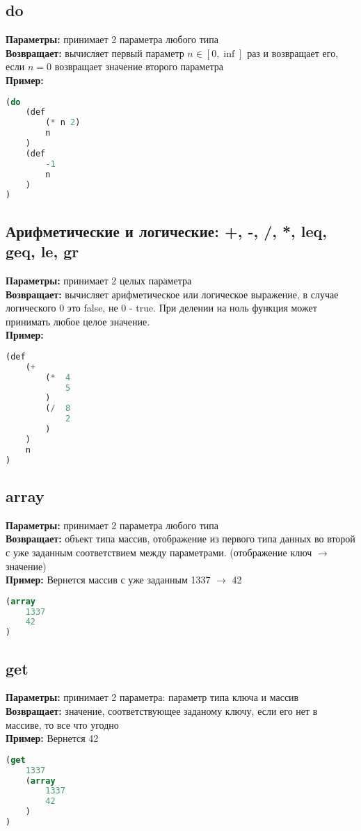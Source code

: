 \documentclass[a4paper,12pt,oneside]{article}
\begin{document}
\subsection{do}
\textbf{Параметры:} принимает 2 параметра любого типа \\
\textbf{Возвращает:} вычисляет первый параметр $n \in [ 0, \inf ] $ раз и возвращает его,
    если $n = 0$ возвращает значение второго параметра \\
\textbf{Пример:} 
\begin{lstlisting}[language=lisp]
(do 
    (def 
        (* n 2)
        n
    ) 
    (def 
        -1 
        n
    )
)
\end{lstlisting}


\subsection{Арифметические и логические: +, -, /, *, leq, geq, le, gr}
\textbf{Параметры:} принимает 2 целых параметра \\
\textbf{Возвращает:} вычисляет арифметическое или логическое выражение, в случае логического 0 это false,
    не 0 - true. При делении на ноль функция может принимать любое целое значение. \\
\textbf{Пример:} 
\begin{lstlisting}[language=lisp]
(def
    (+
        (*  4
            5
        )
        (/  8
            2
        )
    )
    n
)
\end{lstlisting}


\subsection{array}
\textbf{Параметры:} принимает 2 параметра любого типа \\
\textbf{Возвращает:} объект типа массив, отображение из первого типа данных во второй с уже заданным соответствием
    между параметрами. (отображение ключ $\rightarrow$ значение) \\
\textbf{Пример:} Вернется массив с уже заданным 1337 $\rightarrow$ 42
\begin{lstlisting}[language=lisp]
(array
    1337
    42
)
\end{lstlisting}

\subsection{get} 
\textbf{Параметры:} принимает 2 параметра: параметр типа ключа и массив \\
\textbf{Возвращает:} значение, соответствующее заданому ключу, если его нет в массиве, то все что угодно \\
\textbf{Пример:} Вернется 42
\begin{lstlisting}[language=lisp]
(get
    1337
    (array
        1337
        42
    )
)
\end{lstlisting}
\end{document}

